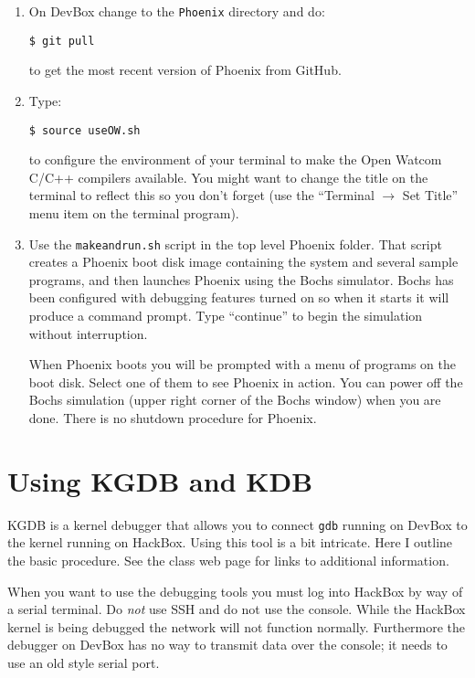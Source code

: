 \documentclass[twocolumn]{article}
\begin{document}
\begin{enumerate}

\item On DevBox change to the \texttt{Phoenix} directory and do:
\begin{Verbatim}
$ git pull
\end{Verbatim}
  to get the most recent version of Phoenix from GitHub.

\item Type:
\begin{Verbatim}
$ source useOW.sh
\end{Verbatim}
  to configure the environment of your terminal to make the Open Watcom C/C++ compilers
  available. You might want to change the title on the terminal to reflect this so you don't
  forget (use the ``Terminal $\rightarrow$ Set Title'' menu item on the terminal program).

\item Use the \texttt{makeandrun.sh} script in the top level Phoenix folder. That script creates
  a Phoenix boot disk image containing the system and several sample programs, and then launches
  Phoenix using the Bochs simulator. Bochs has been configured with debugging features turned on
  so when it starts it will produce a command prompt. Type ``continue'' to begin the simulation
  without interruption.

  When Phoenix boots you will be prompted with a menu of programs on the boot disk. Select one
  of them to see Phoenix in action. You can power off the Bochs simulation (upper right corner
  of the Bochs window) when you are done. There is no shutdown procedure for Phoenix.

\end{enumerate}

\section{Using KGDB and KDB}

KGDB is a kernel debugger that allows you to connect \texttt{gdb} running on DevBox to the
kernel running on HackBox. Using this tool is a bit intricate. Here I outline the basic
procedure. See the class web page for links to additional information.

When you want to use the debugging tools you must log into HackBox by way of a serial terminal.
Do \emph{not} use SSH and do not use the console. While the HackBox kernel is being debugged the
network will not function normally. Furthermore the debugger on DevBox has no way to transmit
data over the console; it needs to use an old style serial port.
\end{document}
